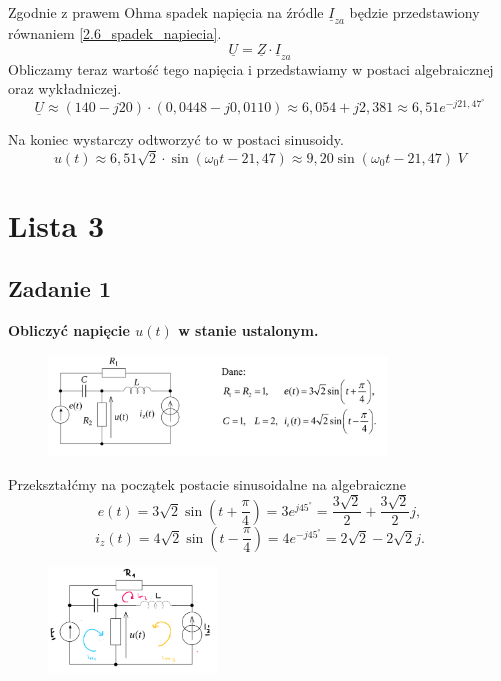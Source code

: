 \documentclass[12pt, a4paper]{article}
\begin{document}
Zgodnie z prawem Ohma spadek napięcia na źródle $\underline{I}_{za}$ będzie
przedstawiony równaniem \ref{2.6_spadek_napiecia}.
\begin{equation}\label{2.6_spadek_napiecia}
  \underline{U} = \underline{Z}\cdot\underline{I}_{za}
\end{equation}
Obliczamy teraz wartość tego napięcia i przedstawiamy w postaci algebraicznej
oraz wykładniczej.
$$
  \underline{U} \approx (140 - j20)\cdot(0,0448-j0,0110) \approx 6,054+j2,381
  \approx 6,51e^{-j21,47^\circ}
$$

Na koniec wystarczy odtworzyć to w postaci sinusoidy.
$$
  u(t) \approx 6,51\sqrt{2}\cdot\sin(\omega_0t-21,47) \approx
  9,20\sin(\omega_0t-21,47)\; V
$$

\section{Lista 3}
\subsection{Zadanie 1}
\textbf{Obliczyć napięcie $u(t)$ w stanie ustalonym.}
\begin{figure}[H]
  \includegraphics[width = 0.8\textwidth]{./images/Lista_3/Zadanie_1.png}
\end{figure}

Przekształćmy na początek postacie sinusoidalne na algebraiczne
\begin{equation*}
  e(t) = 3\sqrt{2}\sin\left(t+\frac{\pi}{4}\right) = 3e^{j45^\circ} =
  \frac{3\sqrt{2}}{2}+\frac{3\sqrt{2}}{2}j,
\end{equation*}
\begin{equation*}
  i_z(t) = 4\sqrt{2}\sin\left(t-\frac{\pi}{4}\right)= 4e^{-j45^\circ} =
  2\sqrt{2}-2\sqrt{2}j.
\end{equation*}

\begin{figure}[H]
  \centering
  \includegraphics[width = 0.4\textwidth]{./images/Lista_3/3.1.png}
\end{figure}
\end{document}
